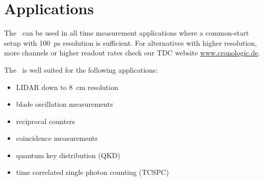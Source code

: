 \section{Applications}
	The \deviceName\  can be used in all time measurement applications where a common-start setup with 100~ps resolution is sufficient. 
	For alternatives with higher resolution, more channels or higher readout rates check our TDC website \href{https://www.cronologic.de/produkte/products-overview#tdcdata}{www.cronologic.de}.

	The \deviceName\ is well suited for the following applications:
	\begin{itemize}
		\item LIDAR down to 8~cm resolution
		\item blade oscillation measurements
		\item reciprocal counters
		\item coincidence measurements
		\item quantum key distribution (QKD)
		\item time correlated single photon counting (TCSPC)
	\end{itemize} 
